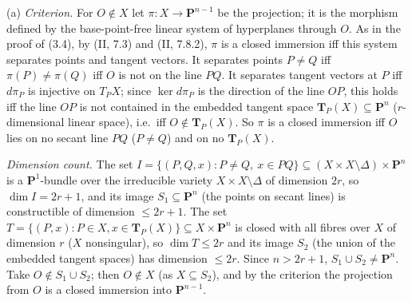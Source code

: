 \documentclass[11pt]{article}
\begin{document}
\pf
(a) \emph{Criterion.} For $O\notin X$ let $\pi:X\to\mathbf P^{n-1}$ be the projection; it is the morphism defined by the base-point-free linear system of hyperplanes through $O$. As in the proof of (3.4), by (II, 7.3) and (II, 7.8.2), $\pi$ is a closed immersion iff this system separates points and tangent vectors. It separates points $P\ne Q$ iff $\pi(P)\ne\pi(Q)$ iff $O$ is not on the line $PQ$. It separates tangent vectors at $P$ iff $d\pi_P$ is injective on $T_PX$; since $\ker d\pi_P$ is the direction of the line $OP$, this holds iff the line $OP$ is not contained in the embedded tangent space $\mathbf T_P(X)\subseteq\mathbf P^n$ ($r$-dimensional linear space), i.e.\ iff $O\notin\mathbf T_P(X)$. So $\pi$ is a closed immersion iff $O$ lies on no secant line $PQ$ ($P\ne Q$) and on no $\mathbf T_P(X)$.

\emph{Dimension count.} The set $I=\{(P,Q,x):P\ne Q,\ x\in PQ\}\subseteq(X\times X\setminus\Delta)\times\mathbf P^n$ is a $\mathbf P^1$-bundle over the irreducible variety $X\times X\setminus\Delta$ of dimension $2r$, so $\dim I=2r+1$, and its image $S_1\subseteq\mathbf P^n$ (the points on secant lines) is constructible of dimension $\le2r+1$. The set $T=\{(P,x):P\in X,x\in\mathbf T_P(X)\}\subseteq X\times\mathbf P^n$ is closed with all fibres over $X$ of dimension $r$ ($X$ nonsingular), so $\dim T\le2r$ and its image $S_2$ (the union of the embedded tangent spaces) has dimension $\le2r$. Since $n>2r+1$, $S_1\cup S_2\ne\mathbf P^n$. Take $O\notin S_1\cup S_2$; then $O\notin X$ (as $X\subseteq S_2$), and by the criterion the projection from $O$ is a closed immersion into $\mathbf P^{n-1}$.
\end{document}
